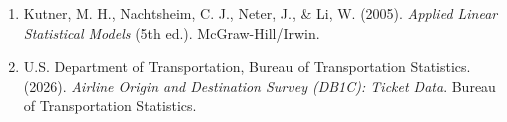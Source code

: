 \documentclass[11pt,a4paper]{article}
\begin{document}
\begin{enumerate}[leftmargin=0pt,label={},itemsep=0.8em]

\item Kutner, M. H., Nachtsheim, C. J., Neter, J., \& Li, W. (2005). \textit{Applied Linear Statistical Models} (5th ed.). McGraw-Hill/Irwin.

\item U.S. Department of Transportation, Bureau of Transportation Statistics. (2026). \textit{Airline Origin and Destination Survey (DB1C): Ticket Data}. Bureau of Transportation Statistics.

\end{enumerate}
\end{document}
